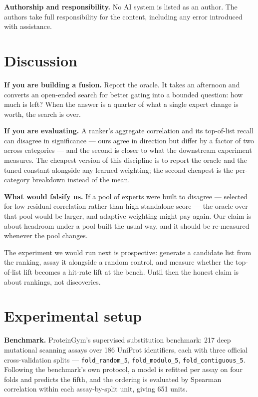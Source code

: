 \documentclass{article}
\begin{document}
\textbf{Authorship and responsibility.} No AI system is listed as an author. The authors take full
responsibility for the content, including any error introduced with assistance.

\section{Discussion}\label{discussion}

\textbf{If you are building a fusion.} Report the oracle. It takes an afternoon and converts an open-ended
search for better gating into a bounded question: how much is left? When the answer is a quarter of what
a single expert change is worth, the search is over.

\textbf{If you are evaluating.} A ranker's aggregate correlation and its top-of-list recall can disagree in
significance --- ours agree in direction but differ by a factor of two across categories --- and the second
is closer to what the downstream experiment measures. The cheapest version of this discipline is to
report the oracle and the tuned constant alongside any learned weighting; the second cheapest is the
per-category breakdown instead of the mean.

\textbf{What would falsify us.} If a pool of experts were built to disagree --- selected for low residual
correlation rather than high standalone score --- the oracle over that pool would be larger, and adaptive
weighting might pay again. Our claim is about headroom under a pool built the usual way, and it should be
re-measured whenever the pool changes.

The experiment we would run next is prospective: generate a candidate list from the ranking, assay it
alongside a random control, and measure whether the top-of-list lift becomes a hit-rate lift at the
bench. Until then the honest claim is about rankings, not discoveries.


\newpage
\appendix
\section{Experimental setup}
\textbf{Benchmark.} ProteinGym's \cite{proteingym} supervised substitution benchmark: 217 deep mutational scanning assays over
186 UniProt identifiers, each with three official cross-validation splits --- \texttt{fold\_random\_5},
\texttt{fold\_modulo\_5}, \texttt{fold\_contiguous\_5}. Following the benchmark's own protocol, a model is refitted per
assay on four folds and predicts the fifth, and the ordering is evaluated by Spearman correlation
within each assay-by-split unit, giving 651 units.
\end{document}
